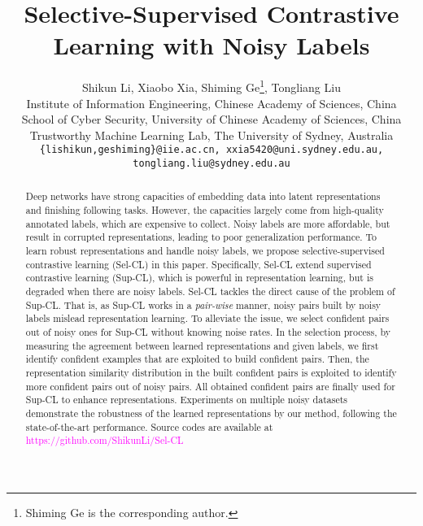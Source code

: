 \documentclass[10pt,twocolumn,letterpaper]{article}
\begin{document}
\title{Selective-Supervised Contrastive Learning with Noisy Labels}



\author{
Shikun Li, Xiaobo Xia, Shiming Ge\thanks{Shiming Ge is the corresponding author.}, Tongliang Liu \\ 
 Institute of Information Engineering, Chinese Academy of Sciences, China \\
 School of Cyber Security, University of Chinese Academy of Sciences, China \\ 
 Trustworthy Machine Learning Lab, The University of Sydney, Australia \\
{\tt\small \{lishikun,geshiming\}@iie.ac.cn, xxia5420@uni.sydney.edu.au, tongliang.liu@sydney.edu.au}
}
\maketitle

\begin{abstract}
Deep networks have strong capacities of embedding data into latent representations and finishing following tasks. However, the capacities largely come from high-quality annotated labels, which are expensive to collect. Noisy labels are more affordable, but result in corrupted representations, leading to poor generalization performance. To learn robust representations and handle noisy labels, we propose selective-supervised  contrastive learning (Sel-CL) in this paper. Specifically, Sel-CL extend supervised contrastive learning (Sup-CL), which is powerful in representation learning, but is degraded when there are noisy labels. Sel-CL tackles the direct cause of the problem of Sup-CL. That is, as Sup-CL works in a \textit{pair-wise} manner, noisy pairs built by noisy labels mislead representation learning. To alleviate the issue, we select confident pairs out of noisy ones for Sup-CL without knowing noise rates. In the selection process, by measuring the agreement between learned representations and given labels, we first identify confident examples that are exploited to build confident pairs. Then, the representation similarity distribution in the built confident pairs is exploited to identify more confident pairs out of noisy pairs. All obtained confident pairs are finally used for Sup-CL to enhance representations. Experiments on multiple noisy datasets demonstrate the robustness of the learned representations by our method, following the state-of-the-art performance. Source codes are available at \textcolor{magenta}{https://github.com/ShikunLi/Sel-CL}
\end{abstract}
\end{document}
